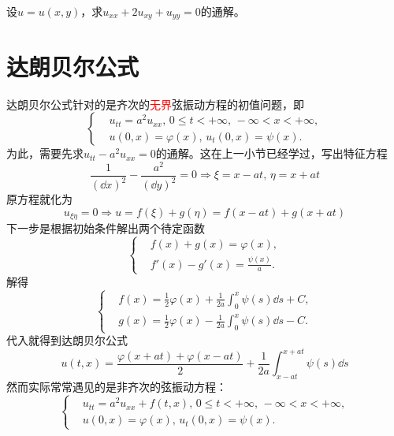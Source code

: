 \begin{problembox}
    \begin{exercise}
        设$u = u(x, y)$，求$u_{xx} + 2 u_{xy} + u_{yy} = 0$的通解。
    \end{exercise}
\end{problembox}
\section{达朗贝尔公式}
达朗贝尔公式针对的是齐次的\textcolor{red}{无界}弦振动方程的初值问题，即
\begin{equation*}
    \left\{
        \begin{aligned}
            &u_{tt} = a^2 u_{xx},\, 0 \leq t < +\infty,\, -\infty < x < +\infty,\\
            &u(0, x) = \varphi(x),\, u_t(0, x) = \psi(x).
        \end{aligned}
    \right.
\end{equation*}
为此，需要先求$u_{tt} - a^2 u_{xx} = 0$的通解。这在上一小节已经学过，写出特征方程
\[\frac{1}{\left(\dd{x}\right)^2} - \frac{a^2}{\left(\dd{y}\right)^2} = 0 \Rightarrow \xi = x - a t,\, \eta = x + at\]
原方程就化为
\[u_{\xi \eta} = 0 \Rightarrow u = f(\xi) + g(\eta) = f(x - a t) + g(x + a t)\]
下一步是根据初始条件解出两个待定函数
\begin{equation*}
    \left\{
        \begin{aligned}
            &f(x) + g(x) = \varphi(x),\\
            &f'(x) - g'(x) = \frac{\psi(x)}{a}.
        \end{aligned}
    \right.
\end{equation*}
解得
\begin{equation*}
    \left\{
        \begin{aligned}
            &f(x) = \frac{1}{2}\varphi(x) + \frac{1}{2a} \int_{0}^{x} \psi(s) \dd{s} + C,\\
            &g(x) = \frac{1}{2}\varphi(x) - \frac{1}{2a} \int_{0}^{x} \psi(s) \dd{s} - C.
        \end{aligned}
    \right.
\end{equation*}
代入就得到达朗贝尔公式
\color{red}
\[u(t, x) = \frac{\varphi(x + a t) + \varphi(x - a t)}{2} + \frac{1}{2a}\int_{x - a t}^{x + a t}\psi(s)\dd{s}\]
\color{black}
然而实际常常遇见的是非齐次的弦振动方程：
\begin{equation*}
    \left\{
        \begin{aligned}
            &u_{tt} = a^2 u_{xx} + f(t, x),\, 0 \leq t < +\infty,\, -\infty < x < +\infty,\\
            &u(0, x) = \varphi(x),\, u_t(0, x) = \psi(x).
        \end{aligned}
    \right.
\end{equation*}
